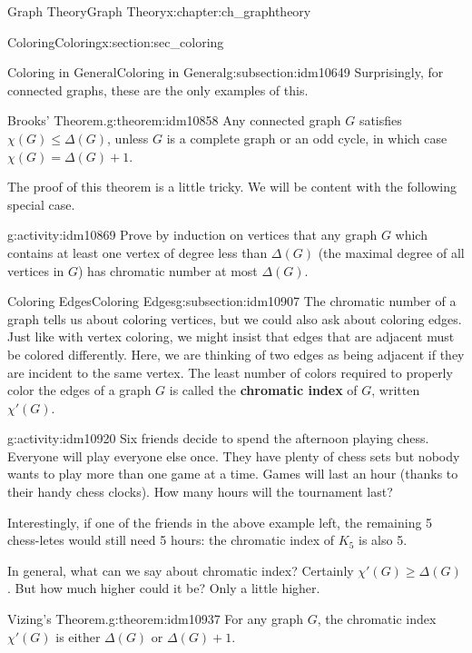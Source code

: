 \documentclass[oneside,10pt,]{book}
\newcommand{\terminology}[1]{\textbf{#1}}
\numberwithin{equation}{chapter}
\begin{document}
\begin{chapterptx}{Graph Theory}{}{Graph Theory}{}{}{x:chapter:ch_graphtheory}
\begin{sectionptx}{Coloring}{}{Coloring}{}{}{x:section:sec_coloring}
\begin{subsectionptx}{Coloring in General}{}{Coloring in General}{}{}{g:subsection:idm10649}
Surprisingly, for connected graphs, these are the only examples of this.%
\begin{theorem}{Brooks' Theorem.}{}{g:theorem:idm10858}%
 Any connected graph \(G\) satisfies \(\chi(G) \le \Delta(G)\), unless \(G\) is a complete graph or an odd cycle, in which case \(\chi(G) = \Delta(G) + 1\).%
\end{theorem}
The proof of this theorem is a little tricky.  We will be content with the following special case.%
\begin{activity}{}{g:activity:idm10869}%
Prove by induction on vertices that any graph \(G\) which contains at least one vertex of degree less than \(\Delta(G)\) (the maximal degree of all vertices in \(G\)) has chromatic number at most \(\Delta(G)\).%
\end{activity}
\end{subsectionptx}
%
%
\typeout{************************************************}
\typeout{************************************************}
%
\begin{subsectionptx}{Coloring Edges}{}{Coloring Edges}{}{}{g:subsection:idm10907}
The chromatic number of a graph tells us about coloring vertices, but we could also ask about coloring edges. Just like with vertex coloring, we might insist that edges that are adjacent must be colored differently. Here, we are thinking of two edges as being adjacent if they are incident to the same vertex. The least number of colors required to properly color the edges of a graph \(G\) is called the \terminology{chromatic index} of \(G\), written \(\chi'(G)\)\label{g:notation:idm10916}.%
\begin{activity}{}{g:activity:idm10920}%
Six friends decide to spend the afternoon playing chess. Everyone will play everyone else once. They have plenty of chess sets but nobody wants to play more than one game at a time. Games will last an hour (thanks to their handy chess clocks). How many hours will the tournament last?%
\end{activity}
Interestingly, if one of the friends in the above example left, the remaining 5 chess-letes would still need 5 hours: the chromatic index of \(K_5\) is also 5.%
\par
In general, what can we say about chromatic index? Certainly \(\chi'(G) \ge \Delta(G)\). But how much higher could it be? Only a little higher.%
\begin{theorem}{Vizing's Theorem.}{}{g:theorem:idm10937}%
 For any graph \(G\), the chromatic index \(\chi'(G)\) is either \(\Delta(G)\) or \(\Delta(G) + 1\).%

\end{theorem}
\end{subsectionptx}
\end{sectionptx}
\end{chapterptx}
\end{document}
